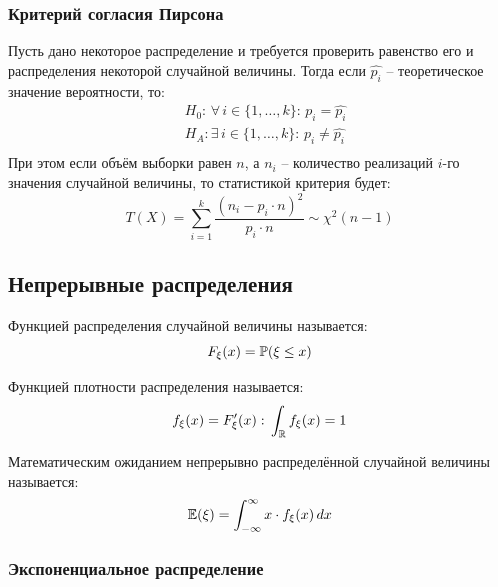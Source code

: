 \documentclass[12pt]{article}
\begin{document}
\subsubsection{Критерий согласия Пирсона}

\begin{statement}
    Пусть дано некоторое распределение и требуется проверить равенство его и распределения некоторой случайной величины. Тогда если $\hat{p_i}$ – теоретическое значение вероятности, то:
    \begin{align*}
        &H_0:\, \forall\, i\in\{1,\ldots,k\}:\,p_i=\hat{p_i}\\
        &H_A: \exists\, i\in\{1,\ldots,k\}:\,p_i\neq\hat{p_i}\\
    \end{align*}
    При этом если объём выборки равен $n$, а $n_i$ – количество реализаций $i$-го значения случайной величины, то статистикой критерия будет:
    $$T(X)=\sum_{i=1}^{k}\frac{(n_i-p_i\cdot n)^2}{p_i\cdot n}\sim \chi^2(n-1)$$
\end{statement}

\subsection{Непрерывные распределения}

\begin{definition}
    Функцией распределения случайной величины называется:
    $$F_\xi(x)=\mathbb{P}(\xi\leq x)$$
\end{definition}
\begin{definition}
    Функцией плотности распределения называется:
    $$f_\xi(x)=F_\xi'(x):\,\int_{\mathbb{R}}f_\xi(x)=1$$
\end{definition}
\begin{definition}
    Математическим ожиданием непрерывно распределённой случайной величины называется:
    $$\mathbb{E}(\xi)=\int_{-\infty}^{\infty}x\cdot f_\xi(x)\,d x$$
\end{definition}

\subsubsection{Экспоненциальное распределение}
\end{document}
